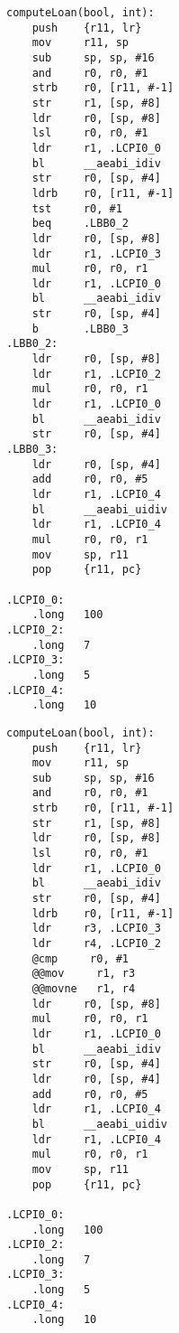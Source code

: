 \begin{minipage}{0.45\textwidth}
    \begin{lstlisting}[style=AsmStyle]
computeLoan(bool, int):
    push    {r11, lr}
    mov     r11, sp
    sub     sp, sp, #16
    and     r0, r0, #1
    strb    r0, [r11, #-1]
    str     r1, [sp, #8]
    ldr     r0, [sp, #8]
    lsl     r0, r0, #1
    ldr     r1, .LCPI0_0
    bl      __aeabi_idiv
    str     r0, [sp, #4]
    ldrb    r0, [r11, #-1]
    tst     r0, #1
    beq     .LBB0_2
    ldr     r0, [sp, #8]
    ldr     r1, .LCPI0_3
    mul     r0, r0, r1
    ldr     r1, .LCPI0_0
    bl      __aeabi_idiv
    str     r0, [sp, #4]
    b       .LBB0_3
.LBB0_2:
    ldr     r0, [sp, #8]
    ldr     r1, .LCPI0_2
    mul     r0, r0, r1
    ldr     r1, .LCPI0_0
    bl      __aeabi_idiv
    str     r0, [sp, #4]
.LBB0_3:
    ldr     r0, [sp, #4]
    add     r0, r0, #5
    ldr     r1, .LCPI0_4
    bl      __aeabi_uidiv
    ldr     r1, .LCPI0_4
    mul     r0, r0, r1
    mov     sp, r11
    pop     {r11, pc}
    
.LCPI0_0:
    .long   100
.LCPI0_2:
    .long   7
.LCPI0_3:
    .long   5
.LCPI0_4:
    .long   10
    \end{lstlisting}
\end{minipage}%
\hspace{1cm}
\begin{minipage}{0.45\textwidth}
    \begin{lstlisting}[style=AsmStyle, numbers=right, belowskip=7.5\baselineskip]
computeLoan(bool, int):
    push    {r11, lr}
    mov     r11, sp
    sub     sp, sp, #16
    and     r0, r0, #1
    strb    r0, [r11, #-1]
    str     r1, [sp, #8]
    ldr     r0, [sp, #8]
    lsl     r0, r0, #1
    ldr     r1, .LCPI0_0
    bl      __aeabi_idiv
    str     r0, [sp, #4]
    ldrb    r0, [r11, #-1]
    ldr     r3, .LCPI0_3
    ldr     r4, .LCPI0_2
    @cmp     r0, #1
    @@mov     r1, r3
    @@movne   r1, r4
    ldr     r0, [sp, #8]
    mul     r0, r0, r1
    ldr     r1, .LCPI0_0
    bl      __aeabi_idiv
    str     r0, [sp, #4]
    ldr     r0, [sp, #4]
    add     r0, r0, #5
    ldr     r1, .LCPI0_4
    bl      __aeabi_uidiv
    ldr     r1, .LCPI0_4
    mul     r0, r0, r1
    mov     sp, r11
    pop     {r11, pc}

.LCPI0_0:
    .long   100
.LCPI0_2:
    .long   7
.LCPI0_3:
    .long   5
.LCPI0_4:
    .long   10    
    \end{lstlisting}
\end{minipage}%
